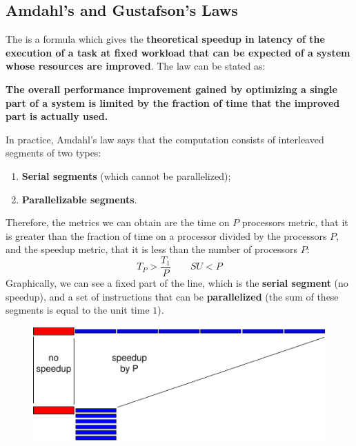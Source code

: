 \subsection{Amdahl's and Gustafson's Laws}

The  is a formula which gives the \textbf{theoretical speedup in latency of the execution of a task at fixed workload that can be expected of a system whose resources are improved}. The law can be stated as:
\begin{definitionbox}
    \textbf{The overall performance improvement gained by optimizing a single part of a system is limited by the fraction of time that the improved part is actually used.}
\end{definitionbox}

\noindent
In practice, Amdahl's law says that the computation consists of interleaved segments of two types:
\begin{enumerate}
    \item \textbf{Serial segments} (which cannot be parallelized);
    \item \textbf{Parallelizable segments}.
\end{enumerate}
Therefore, the metrics we can obtain are the time on $P$ processors metric, that it is greater than the fraction of time on a processor divided by the processors $P$, and the speedup metric, that it is less than the number of processors $P$:
\begin{equation*}
    T_{P} > \dfrac{T_{1}}{P} \hspace{2em} SU < P
\end{equation*}
Graphically, we can see a fixed part of the line, which is the \textbf{serial segment} (no speedup), and a set of instructions that can be \textbf{parallelized} (the sum of these segments is equal to the unit time $1$).
\begin{figure}[!htp]
    \centering
    \includegraphics[width=\textwidth]{img/amdahl-law-1.pdf}
\end{figure}

